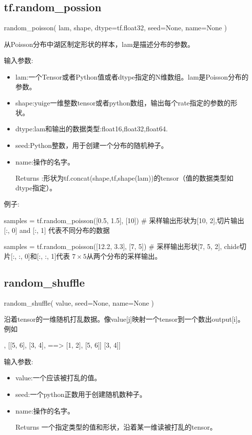 \subsection{tf.random\_possion}
\begin{python}
random_poisson(
    lam,
    shape,
    dtype=tf.float32,
    seed=None,
    name=None
)
\end{python}
从Poisson分布中湖区制定形状的样本，lam是描述分布的参数。

输入参数:
\begin{itemize}
\item lam:一个Tensor或者Python值或者dtype指定的N维数组。lam是Poisson分布的参数。
\item shape:yuige一维整数tensor或者python数组，输出每个rate指定的参数的形状。
\item dtype:lam和输出的数据类型:float16,float32,float64.
\item seed:Python整数，用于创建一个分布的随机种子。
\item name:操作的名字。
\item[Returns]:形状为tf.concat(shape,tf,shape(lam))的tensor（值的数据类型如dtype指定）。
\end{itemize}
例子:
\begin{python}
samples = tf.random_poisson([0.5, 1.5], [10]) # 采样输出形状为[10, 2],切片输出 [:, 0] and [:, 1] 代表不同分布的数据

samples = tf.random_poisson([12.2, 3.3], [7, 5]) # 采样输出形状[7, 5, 2], chide切片[:, :, 0]和[:, :, 1]代表 $7\times5$从两个分布的采样输出。
\end{python}
\subsection{random\_shuffle}
\begin{python}
random_shuffle(
    value,
    seed=None,
    name=None
)
\end{python}
沿着tensor的一维随机打乱数据。像value[j]映射一个tensor到一个数出output[i]。例如
\begin{python}
[[1, 2],       [[5, 6],
 [3, 4],  ==>   [1, 2],
 [5, 6]]        [3, 4]]
\end{python}
输入参数:
\begin{itemize}
\item value:一个应该被打乱的值。
\item seed:一个python正数用于创建随机数种子。
\item name:操作的名字。
\item[Returns] 一个指定类型的值和形状，沿着某一维读被打乱的tensor。
\end{itemize}
